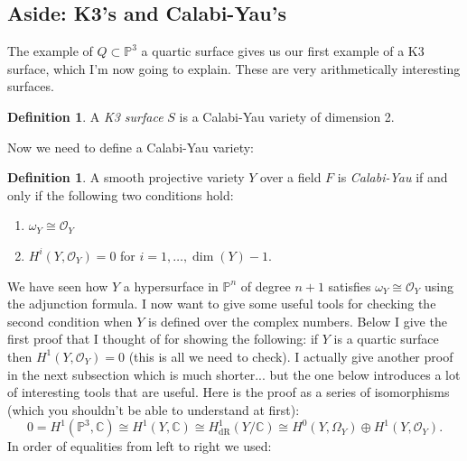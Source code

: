 \documentclass[12pt]{article}
\numberwithin{equation}{section}
\theoremstyle{definition}
\newtheorem{definition}[theorem]{Definition}
\theoremstyle{remark}
\newcommand{\CC}{\mathbb{C}}
\newcommand{\Ocal}{\mathcal{O}}
\newcommand{\PP}{\mathbb{P}}
\newcommand{\dR}{\operatorname{dR}}
\begin{document}
\subsection{Aside: K3's and Calabi-Yau's}
The example of $Q\subset \PP^3$ a quartic surface gives us our first example of a K3 surface, which I'm now going to explain. 
These are very arithmetically interesting surfaces. 
\begin{definition}
	A \emph{K3 surface} $S$ is a Calabi-Yau variety of dimension 2. 
\end{definition}
Now we need to define a Calabi-Yau variety:
\begin{definition}
	A smooth projective variety $Y$ over a field $F$ is \emph{Calabi-Yau} if and only if the following two conditions hold:
	\begin{enumerate}
		\item $\omega_Y \cong \Ocal_Y$
		\item $H^i(Y,\Ocal_Y)=0$ for $i=1,\ldots,\dim(Y)-1$.
	\end{enumerate} 
\end{definition}
We have seen how $Y$ a hypersurface in $\PP^n$ of degree $n+1$ satisfies $\omega_Y\cong \Ocal_Y$ using the adjunction formula. 
I now want to give some useful tools for checking the second condition when $Y$ is defined over the complex numbers. 
Below I give the first proof that I thought of for showing the following: if $Y$ is a quartic surface then $H^1(Y,\Ocal_Y)=0$ (this is all we need to check). I actually give another proof in the next subsection which is much shorter... but the one below introduces a lot of interesting tools that are useful.
Here is the proof as a series of isomorphisms (which you shouldn't be able to understand at first):
\begin{equation}
 0=H^1(\PP^3,\CC) \cong H^1(Y,\CC) \cong H^1_{\dR}(Y/\CC) \cong H^0(Y,\Omega_Y) \oplus H^1(Y,\Ocal_Y).
\end{equation}
In order of equalities from left to right we used:
\end{document}
